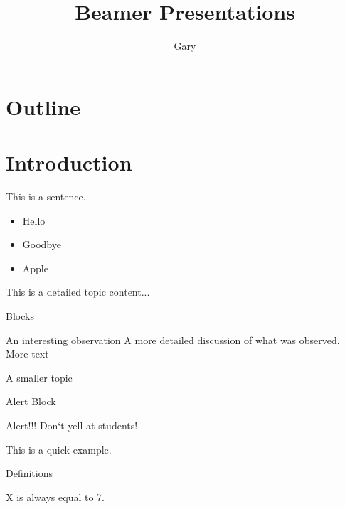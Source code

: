 \documentclass[handout]{beamer}
\title{Beamer Presentations}
\date{}
\author{Gary}
\begin{document}
\maketitle

\section{Outline}
\begin{frame}
	\tableofcontents
\end{frame}

\section{Introduction}\label{introduction}

\begin{frame}
This is a sentence...
\begin{itemize}
	\item Hello
	\item Goodbye
	\item Apple 
\end{itemize}
\end{frame}

\begin{frame}{This is a detailed topic}
	content...
\end{frame}

\begin{frame}{Blocks}
	\begin{block}{An interesting observation}
		A more detailed discussion of what was observed. \\
		More text
	\end{block}
A smaller topic
\end{frame}

\begin{frame}{Alert Block}
	\begin{alertblock}{Alert!!!}
		Don`t yell at students!
	\end{alertblock}
\end{frame}

\begin{frame}
	\begin{example}
		This is a quick example. 
	\end{example}
\end{frame}

\begin{frame}{Definitions}
	\begin{definition}
		X is always equal to 7. 
	\end{definition}
\end{frame}
\end{document}
